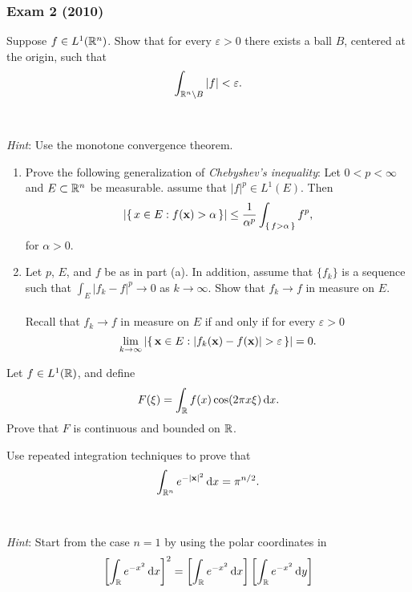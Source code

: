 \subsubsection{Exam 2 (2010)}
\setcounter{exercise}{0}
\setcounter{equation}{0}

\begin{problem}
Suppose $f\in L^1(\mathbb{R}^n)$. Show that for every $\varepsilon>0$ there
exists a ball $B$, centered at the origin, such that
\[
\int_{\mathbb{R}^n\setminus B}|f|<\varepsilon.
\]
\\\\
\emph{Hint}: Use the monotone convergence theorem.
\end{problem}
\begin{solution}
\end{solution}
\begin{problem}
\begin{enumerate}[label=(\alph*),noitemsep]
\item Prove the following generalization of \emph{Chebyshev's inequality}:
  Let $0<p<\infty$ and $E\subset\mathbb{R}^n$ be measurable. assume that
  $|f|^p\in L^1(E)$. Then
\[
\left|\left\{\,x\in E:f(\mathbf{x})>\alpha\,\right\}\right|
\leq\frac{1}{\alpha^p}\int_{\left\{\,f>\alpha\,\right\}}f^p,
\]
for $\alpha>0$.
\item Let $p$, $E$, and $f$ be as in part (a). In addition, assume that
  $\{f_k\}$ is a sequence such that $\int_E|f_k-f|^p\to 0$ as
  $k\to\infty$. Show that $f_k\to f$ in measure on $E$.
\\\\
Recall that $f_k\to f$ in measure on $E$ if and only if for every
$\varepsilon>0$
\[
\lim_{k\to\infty}\left|\left\{\,\bfx\in
    E:|f_k(\bfx)-f(\bfx)|>\varepsilon\,\right\}\right|=0.
\]
\end{enumerate}
\end{problem}
\begin{solution}
\end{solution}

\begin{problem}
Let $f\in L^1(\mathbb{R})$, and define
\[
F(\xi)=\int_{\mathbb{R}} f(x)\cos(2\pi x\xi)\mathop{}\!\mathrm{d} x.
\]
Prove that $F$ is continuous and bounded on $\mathbb{R}$.
\end{problem}
\begin{solution}
\end{solution}

\begin{problem}
Use repeated integration techniques to prove that
\[
\int_{\mathbb{R}^n} e^{-|\mathbf{x}|^2}\mathop{}\!\mathrm{d} x=\pi^{n/2}.
\]
\\\\
\emph{Hint}: Start from the case $n=1$ by using the polar coordinates in
\[
  \left[\int_{\bbR} e^{-x^2}\diff x\right]^2=%
  \left[\int_{\bbR} e^{-x^2}\diff x\right]%
  \left[\int_{\bbR} e^{-x^2}\diff y\right]%
\]
\end{problem}
\begin{solution}
\end{solution}

\begin{problem}
\end{problem}
\begin{solution}
\end{solution}

